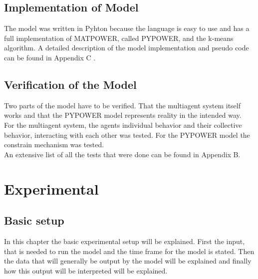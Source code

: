 \documentclass[a4paper]{article}
\begin{document}
\subsection{Implementation of Model}
The model was written in Pyhton because the language is easy to use and has a full implementation of MATPOWER, called
PYPOWER, and the k-means algorithm. A detailed description of the model implementation and pseudo 
code can be found in Appendix C . 
\subsection{Verification of the Model}
Two parts of the model have to be verified. That the multiagent system itself works and that the PYPOWER model 
represents reality in the intended way.\\
For the multiagent system, the agents individual behavior and their collective behavior, interacting with each other was 
tested. For the PYPOWER model the constrain mechanism was tested.\\
An extensive list of all the tests that were done can be found in Appendix B. 

\newpage

\section{Experimental}
\subsection{Basic setup}
In this chapter the basic experimental setup will be explained. First the input, that is needed to run the model 
and the time frame for the model is stated. Then the data that will generally be output by the model will be explained 
and finally how this output will be interpreted will be explained. 
\end{document}
